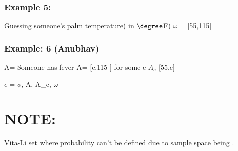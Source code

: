 \documentclass{article}
\begin{document}
\subsubsection{Example 5:}

Guessing someone's palm temperature( in $\degree $F)
$\omega$ = [55,115]

\subsubsection{Example: 6 (Anubhav)}
A= Someone has fever
A= [c,115 ] for some c
$A_c$ [55,c]

$\epsilon$ = {$\phi$, A, A_c, $\omega$}
\section{NOTE:}
Vita-Li set where probability can't be defined due to sample space being \infty.
\end{document}
